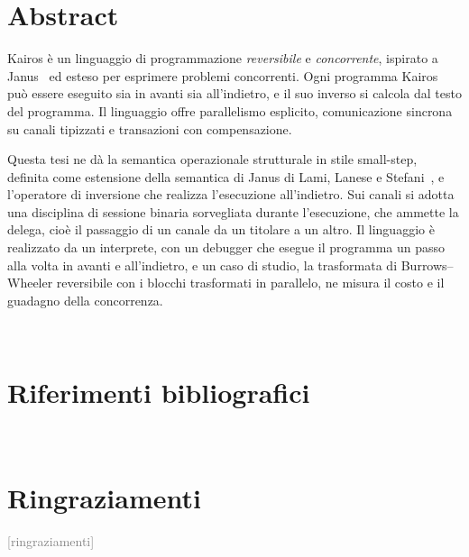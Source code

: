 \documentclass[12pt,a4paper,twoside]{book}
\begin{document}



\chapter*{Abstract}
Kairos è un linguaggio di programmazione \emph{reversibile} e
\emph{concorrente}, ispirato a Janus~\cite{YokoyamaGluck2007} ed esteso per
esprimere problemi concorrenti. Ogni programma Kairos può essere eseguito sia in
avanti sia all'indietro, e il suo inverso si calcola dal testo del
programma. Il linguaggio offre parallelismo esplicito,
comunicazione sincrona su canali tipizzati e transazioni con compensazione.

Questa tesi ne dà la semantica operazionale strutturale in stile small-step,
definita come estensione della semantica di Janus di Lami, Lanese e
Stefani~\cite{LamiLaneseStefani2024}, e l'operatore di inversione che realizza
l'esecuzione all'indietro. Sui canali si adotta una disciplina di sessione
binaria sorvegliata durante l'esecuzione, che ammette la delega, cioè il
passaggio di un canale da un titolare a un altro.
Il linguaggio è realizzato da un interprete, con un debugger che esegue il
programma un passo alla volta in avanti e all'indietro, e un caso di studio, la
trasformata di Burrows--Wheeler reversibile con i blocchi trasformati in
parallelo, ne misura il costo e il guadagno della concorrenza.

\topmargin=-1cm
\tableofcontents
\thispagestyle{empty}
\listoftables
\thispagestyle{empty}
\newpage~\newpage

\setcounter{chapter}{-1}   %
\raggedbottom
\pagestyle{plain}
\setcounter{page}{1}



\renewcommand{\bibsection}{}
\chapter*{Riferimenti bibliografici}

\newpage


\newpage~\newpage
\chapter*{Ringraziamenti}
\textcolor{gray}{[ringraziamenti]}
\end{document}
